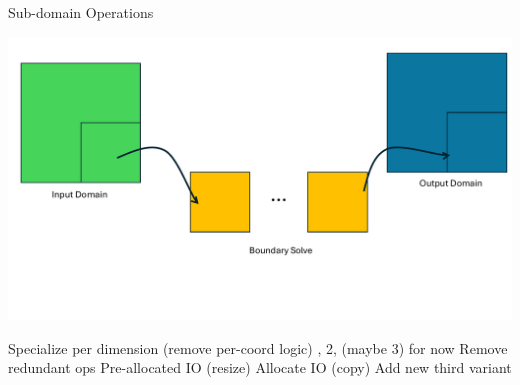 \begin{frame}{Sub-domain Operations}
  \begin{center}
    \includegraphics[width=0.6\linewidth]{subdomain_ops.pdf}
  \end{center}
  \begin{outline}
    \1 Specialize per dimension (remove per-coord logic)
    , 2, (maybe 3) for now
    \1 Remove redundant ops
    \2 Pre-allocated IO (resize) 
    \2 Allocate IO (copy) 
    \2 Add new third variant
  \end{outline}
\end{frame}
